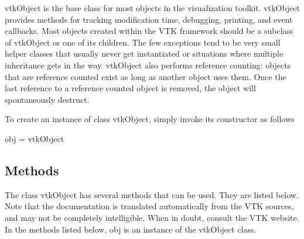 vtk\-Object is the base class for most objects in the visualization toolkit. vtk\-Object provides methods for tracking modification time, debugging, printing, and event callbacks. Most objects created within the V\-T\-K framework should be a subclass of vtk\-Object or one of its children. The few exceptions tend to be very small helper classes that usually never get instantiated or situations where multiple inheritance gets in the way. vtk\-Object also performs reference counting\-: objects that are reference counted exist as long as another object uses them. Once the last reference to a reference counted object is removed, the object will spontaneously destruct.

To create an instance of class vtk\-Object, simply invoke its constructor as follows \begin{DoxyVerb}  obj = vtkObject
\end{DoxyVerb}
 \hypertarget{vtkwidgets_vtkxyplotwidget_Methods}{}\subsection{Methods}\label{vtkwidgets_vtkxyplotwidget_Methods}
The class vtk\-Object has several methods that can be used. They are listed below. Note that the documentation is translated automatically from the V\-T\-K sources, and may not be completely intelligible. When in doubt, consult the V\-T\-K website. In the methods listed below, {\ttfamily obj} is an instance of the vtk\-Object class. 
